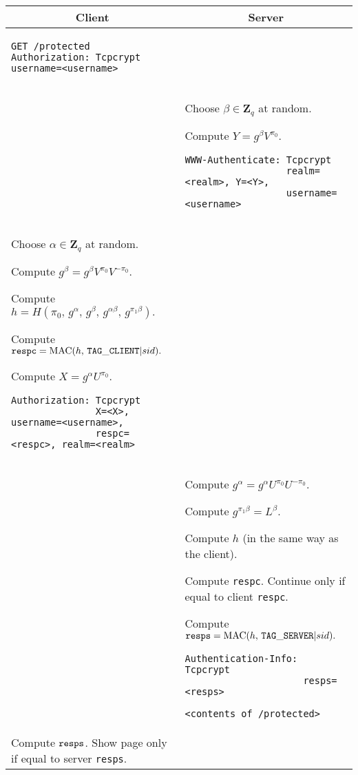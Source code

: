 \documentclass[10pt]{article}
\begin{document}
\begin{tabular}{p{9cm} | p{9cm}}
\multicolumn{1}{c}{\bf Client} & \multicolumn{1}{c}{\bf Server} \\
\hline
\begin{verbatim}
GET /protected
Authorization: Tcpcrypt username=<username>
\end{verbatim} \\

& Choose $\beta \in \mathbf{Z}_q$ at random.

Compute $Y=g^\beta V^{\pi_0}.$

\begin{verbatim}
WWW-Authenticate: Tcpcrypt 
                  realm=<realm>, Y=<Y>,
                  username=<username>
\end{verbatim} \\

Choose $\alpha \in \mathbf{Z}_q$ at random.

Compute $g^\beta = g^\beta V^{\pi_0} V^{-\pi_0}.$

Compute $h = H(\pi_0,\, g^\alpha,\, g^\beta,\, g^{\alpha \beta},\, g^{\pi_1 \beta}).$

Compute ${\tt respc} = \operatorname{MAC}(h,\, {\tt TAG\_CLIENT} | sid).$

Compute $X=g^\alpha U^{\pi_0}.$

\begin{verbatim}
Authorization: Tcpcrypt 
               X=<X>, username=<username>,
               respc=<respc>, realm=<realm>
\end{verbatim}

& \\

& Compute $g^\alpha = g^\alpha U^{\pi_0} U^{-\pi_0}.$

Compute $g^{\pi_1 \beta} = L^\beta.$

Compute $h$ (in the same way as the client).

Compute {\tt respc}. Continue only if equal to client {\tt respc}.

Compute ${\tt resps} = \operatorname{MAC}(h,\, {\tt TAG\_SERVER} | sid).$
\begin{verbatim}
Authentication-Info: Tcpcrypt 
                     resps=<resps>

<contents of /protected>
\end{verbatim} \\

Compute ${\tt resps}$. Show page only if equal to server {\tt resps}.
\end{tabular}
\end{document}
